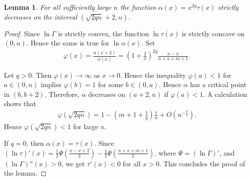 \documentclass[10pt]{amsart}
\newtheorem{lemma}{Lemma}
\theoremstyle{remark}
\begin{document}
\begin{lemma}\label{jqtau}
For all sufficiently large $n$ the function ${{\mathord{\alpha}}}(x)=x^{2q}\tau(x)$
strictly decreases on the interval $(\sqrt{2qn}+2,n)$.
\end{lemma}
\begin{proof}
Since $\ln{{\mathord{\Gamma}}}$ is strictly convex, the function $\ln\tau(x)$  is
strictly concave on $(0,n)$. Hence the same is true for
$\ln{{\mathord{\alpha}}}(x)$.  Set
\begin{eqnarray*}
{{\mathord{\varphi}}}(x)=\frac{{{\mathord{\alpha}}}(x+2)}{{{\mathord{\alpha}}}(x)}
=\left(1+\frac{2}{x}\right)^{2q}\frac{n-x}{n+x+m+1}.
\end{eqnarray*}

Let $q>0$. Then ${{\mathord{\varphi}}}(x)\to\infty$ as $x\to0$. Hence the inequality
${{\mathord{\varphi}}}(a)<1$ for $a\in(0,n)$ implies ${{\mathord{\varphi}}}(b)=1$ for some
$b\in(0,a)$. Hence ${{\mathord{\alpha}}}$ has a critical point in $(b,b+2)$.
Therefore, ${{\mathord{\alpha}}}$ decreases on $(a+2,n)$ if ${{\mathord{\varphi}}}(a)<1$. A
calculation shows that
\begin{eqnarray*}
{{\mathord{\varphi}}}(\sqrt{2qn})=1-\left(m+1+\frac{1}{q}\right)\frac{1}{n}
+O\left(n^{-\frac32}\right).
\end{eqnarray*}
Hence ${{\mathord{\varphi}}}(\sqrt{2qn})<1$ for large $n$.

If $q=0$, then ${{\mathord{\alpha}}}(x)=\tau(x)$. Since
$(\ln\tau)'(x)=\frac12\Psi\left(\frac{n-x+2}{2}\right)
-\frac12\Psi\left(\frac{n+x+m+1}{2}\right)$, where
$\Psi=(\ln{{\mathord{\Gamma}}})'$, and $(\ln{{\mathord{\Gamma}}})''(x)>0$, we get $\tau'(x)<0$ for
all $x>0$. This concludes the proof of the lemma.
\end{proof}
\end{document}
